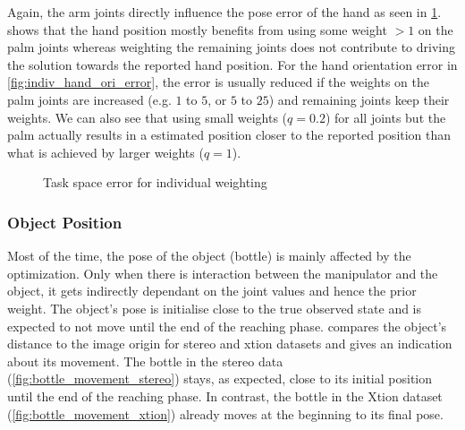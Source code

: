 Again, the arm joints directly influence the pose error of the hand as seen in \cref{fig:indiv_pose_error}.  shows that the hand position mostly benefits from using some weight $>1$ on the palm joints whereas weighting the remaining joints does not contribute to driving the solution towards the reported hand position. For the hand orientation error in \cref{fig:indiv_hand_ori_error}, the error is usually reduced if the weights on the palm joints are increased (e.g. $1$ to $5$, or $5$ to $25$) and remaining joints keep their weights. We can also see that using small weights ($q=0.2$) for all joints but the palm actually results in a estimated position closer to the reported position than what is achieved by larger weights ($q=1$).

\begin{figure}
\centering
{}
%

\caption{Task space error for individual weighting}
\label{fig:indiv_pose_error}
\end{figure}

\subsubsection{Object Position}

Most of the time, the pose of the object (bottle) is mainly affected by the optimization. Only when there is interaction between the manipulator and the object, it gets indirectly dependant on the joint values and hence the prior weight. The object's pose is initialise close to the true observed state and is expected to not move until the end of the reaching phase.  compares the object's distance to the image origin for stereo and xtion datasets and gives an indication about its movement. The bottle in the stereo data (\cref{fig:bottle_movement_stereo}) stays, as expected, close to its initial position until the end of the reaching phase. In contrast, the bottle in the Xtion dataset (\cref{fig:bottle_movement_xtion}) already moves at the beginning to its final pose.

